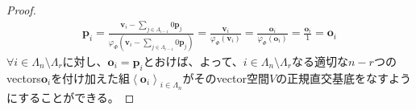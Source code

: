 \documentclass[dvipdfmx]{jsarticle}
\begin{document}
\begin{proof}
\begin{align*}
\mathbf{p}_{i} = \frac{\mathbf{v}_{i} - \sum_{j \in \varLambda_{i - 1}} {0\mathbf{p}_{j}}}{\varphi_{\varPhi}\left( \mathbf{v}_{i} - \sum_{j \in \varLambda_{i - 1}} {0\mathbf{p}_{j}} \right)} = \frac{\mathbf{v}_{i}}{\varphi_{\varPhi}\left( \mathbf{v}_{i} \right)} = \frac{\mathbf{o}_{i}}{\varphi_{\varPhi}\left( \mathbf{o}_{i} \right)} = \frac{\mathbf{o}_{i}}{1} = \mathbf{o}_{i}
\end{align*}
$\forall i \in \varLambda_{n} \setminus \varLambda_{r}$に対し、$\mathbf{o}_{i} = \mathbf{p}_{i}$とおけば、よって、$i \in \varLambda_{n} \setminus \varLambda_{r}$なる適切な$n - r$つのvectors$\mathbf{o}_{i}$を付け加えた組$\left\langle \mathbf{o}_{i} \right\rangle_{i \in \varLambda_{n}}$がそのvector空間$V$の正規直交基底をなすようにすることができる。
\end{proof}
\end{document}
